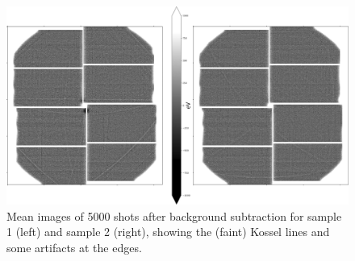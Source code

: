 \begin{figure}[h!]
	\centering
	\includegraphics[width=0.8\linewidth]{images/kossel_gaas.png}
	\caption[Mean image of fluorescence of GaAs after background subtraction with visible Kossel lines ]{Mean images of 5000 shots after background subtraction for sample 1 (left) and sample 2 (right), showing the (faint) Kossel lines and some artifacts at the edges.}
	\label{fig:kosselgaasmean}
\end{figure}



